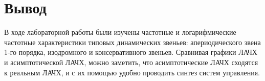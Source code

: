 \documentclass[12pt,a4paper]{article}
\begin{document}
\newpage
\section*{Вывод}
В ходе лабораторной работы были изучены частотные и логарифмические частотные характеристики типовых динамических звеньев: апериодического звена 1-го порядка, изодромного и консервативного звеньев.
Сравнивая графики ЛАЧХ и асимптотической ЛАЧХ, можно заметить, что асимптотические ЛАЧХ сходятся к реальным ЛАЧХ, и с их помощью удобно проводить синтез систем управления.\par
\end{document}
